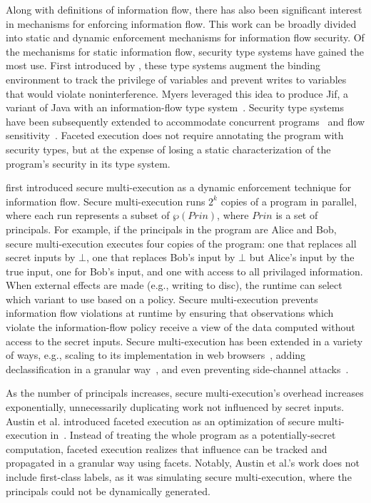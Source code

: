\documentclass[review=true,acmlarge]{acmart}
\newcommand{\var}[1]{\mathit{#1}}
\begin{document}
Along with definitions of information flow, there has also been
significant interest in mechanisms for enforcing information
flow. This work can be broadly divided into static and dynamic
enforcement mechanisms for information flow security. Of the
mechanisms for static information flow, security type systems have
gained the most use. First introduced by \citet{Volpano:1997}, these
type systems augment the binding environment to track the privilege of
variables and prevent writes to variables that would violate
noninterference. Myers leveraged this idea to produce Jif, a variant
of Java with an information-flow type
system~\cite{Myers:1999}. Security type systems have been subsequently
extended to accommodate concurrent programs~\cite{Zdancewic:03} and
flow sensitivity~\cite{Hunt:2006}. Faceted execution does not require
annotating the program with security types, but at the expense of
losing a static characterization of the program's security in its type
system.

\citet{Devriese:10} first introduced secure multi-execution as a
dynamic enforcement technique for information flow. Secure
multi-execution runs $2^k$ copies of a program in parallel, where each
run represents a subset of $\wp(\var{Prin})$, where $\var{Prin}$ is a
set of principals. For example, if the principals in the program are
Alice and Bob, secure multi-execution executes four copies of the
program: one that replaces all secret inputs by $\bot$, one that
replaces Bob's input by $\bot$ but Alice's input by the true input,
one for Bob's input, and one with access to all privilaged
information. When external effects are made (e.g., writing to disc),
the runtime can select which variant to use based on a policy. Secure
multi-execution prevents information flow violations at runtime by
ensuring that observations which violate the information-flow policy
receive a view of the data computed without access to the secret
inputs. Secure multi-execution has been extended in a variety of ways,
e.g., scaling to its implementation in web browsers~\cite{Bielova:11},
adding declassification in a granular way~\cite{Rafnsson:13}, and even
preventing side-channel attacks~\cite{Kashyap:11}.

As the number of principals increases, secure multi-execution's
overhead increases exponentially, unnecessarily duplicating work not
influenced by secret inputs. Austin et al. introduced faceted
execution as an optimization of secure multi-execution
in~\cite{Austin:2012}. Instead of treating the whole program as a
potentially-secret computation, faceted execution realizes that
influence can be tracked and propagated in a granular way using
facets. Notably, Austin et al.'s work does not include first-class
labels, as it was simulating secure multi-execution, where the
principals could not be dynamically generated.
\end{document}
